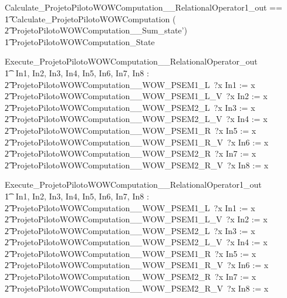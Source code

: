 \documentclass{article}
\begin{document}
\begin{circusaction}
  Calculate\_ProjetoPilotoWOWComputation\_\_RelationalOperator1\_out ==\\
    \t1 Calculate\_ProjetoPilotoWOWComputation \hide (\\
      \t2 ProjetoPilotoWOWComputation\_\_Sum\_state')\\
    \t1 \land \Xi ProjetoPilotoWOWComputation\_State
\end{circusaction}
\vspace{-2.8em}

\begin{circusaction}
  Execute\_ProjetoPilotoWOWComputation\_\_RelationalOperator\_out \circdef\\
    \t1 \circvar\ In1, In2, In3, In4, In5, In6, In7, In8 : \nat \circspot\\
      \t2 ProjetoPilotoWOWComputation\_\_WOW\_PSEM1\_L~?x \then In1 := x \circseq\\
      \t2 ProjetoPilotoWOWComputation\_\_WOW\_PSEM1\_L\_V~?x \then In2 := x \circseq\\
      \t2 ProjetoPilotoWOWComputation\_\_WOW\_PSEM2\_L~?x \then In3 := x \circseq\\
      \t2 ProjetoPilotoWOWComputation\_\_WOW\_PSEM2\_L\_V~?x \then In4 := x \circseq\\
      \t2 ProjetoPilotoWOWComputation\_\_WOW\_PSEM1\_R~?x \then In5 := x \circseq\\
      \t2 ProjetoPilotoWOWComputation\_\_WOW\_PSEM1\_R\_V~?x \then In6 := x \circseq\\
      \t2 ProjetoPilotoWOWComputation\_\_WOW\_PSEM2\_R~?x \then In7 := x \circseq\\
      \t2 ProjetoPilotoWOWComputation\_\_WOW\_PSEM2\_R\_V~?x \then In8 := x
\end{circusaction}
\vspace{-2.8em}

\begin{circusaction}
  Execute\_ProjetoPilotoWOWComputation\_\_RelationalOperator1\_out \circdef\\
    \t1 \circvar\ In1, In2, In3, In4, In5, In6, In7, In8 : \nat \circspot\\
      \t2 ProjetoPilotoWOWComputation\_\_WOW\_PSEM1\_L~?x \then In1 := x \circseq\\
      \t2 ProjetoPilotoWOWComputation\_\_WOW\_PSEM1\_L\_V~?x \then In2 := x \circseq\\
      \t2 ProjetoPilotoWOWComputation\_\_WOW\_PSEM2\_L~?x \then In3 := x \circseq\\
      \t2 ProjetoPilotoWOWComputation\_\_WOW\_PSEM2\_L\_V~?x \then In4 := x \circseq\\
      \t2 ProjetoPilotoWOWComputation\_\_WOW\_PSEM1\_R~?x \then In5 := x \circseq\\
      \t2 ProjetoPilotoWOWComputation\_\_WOW\_PSEM1\_R\_V~?x \then In6 := x \circseq\\
      \t2 ProjetoPilotoWOWComputation\_\_WOW\_PSEM2\_R~?x \then In7 := x \circseq\\
      \t2 ProjetoPilotoWOWComputation\_\_WOW\_PSEM2\_R\_V~?x \then In8 := x
\end{circusaction}
\vspace{-2.8em}
\end{document}

